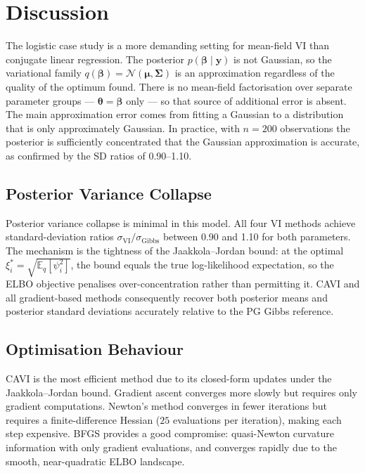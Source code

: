 \documentclass[11pt,a4paper]{article}
\newcommand{\E}{\mathbb{E}}
\newcommand{\N}{\mathcal{N}}
\begin{document}
\section{Discussion}

The logistic case study is a more demanding setting for mean-field VI than conjugate
linear regression. The posterior $p(\bm{\beta}\mid\bm{y})$ is not Gaussian, so the
variational family $q(\bm{\beta})=\N(\bm{\mu},\bm{\Sigma})$ is an approximation
regardless of the quality of the optimum found. There is no mean-field factorisation
over separate parameter groups --- $\bm{\theta}=\bm{\beta}$ only --- so that source
of additional error is absent. The main approximation error comes from fitting a
Gaussian to a distribution that is only approximately Gaussian. In practice, with
$n=200$ observations the posterior is sufficiently concentrated that the Gaussian
approximation is accurate, as confirmed by the SD ratios of 0.90--1.10.

\subsection{Posterior Variance Collapse}

Posterior variance collapse is minimal in this model.
All four VI methods achieve standard-deviation ratios $\sigma_{\mathrm{VI}}/\sigma_{\mathrm{Gibbs}}$
between 0.90 and 1.10 for both parameters.
The mechanism is the tightness of the Jaakkola--Jordan bound: at the optimal
$\xi_i^* = \sqrt{\E_q[\psi_i^2]}$, the bound equals the true log-likelihood expectation,
so the ELBO objective penalises over-concentration rather than permitting it.
CAVI and all gradient-based methods consequently recover both posterior means and
posterior standard deviations accurately relative to the PG Gibbs reference.

\subsection{Optimisation Behaviour}

CAVI is the most efficient method due to its closed-form updates under the
Jaakkola--Jordan bound.
Gradient ascent converges more slowly but requires only gradient computations.
Newton's method converges in fewer iterations but requires a finite-difference Hessian
($25$ evaluations per iteration), making each step expensive.
BFGS provides a good compromise: quasi-Newton curvature information with only gradient
evaluations, and converges rapidly due to the smooth, near-quadratic ELBO landscape.
\end{document}
